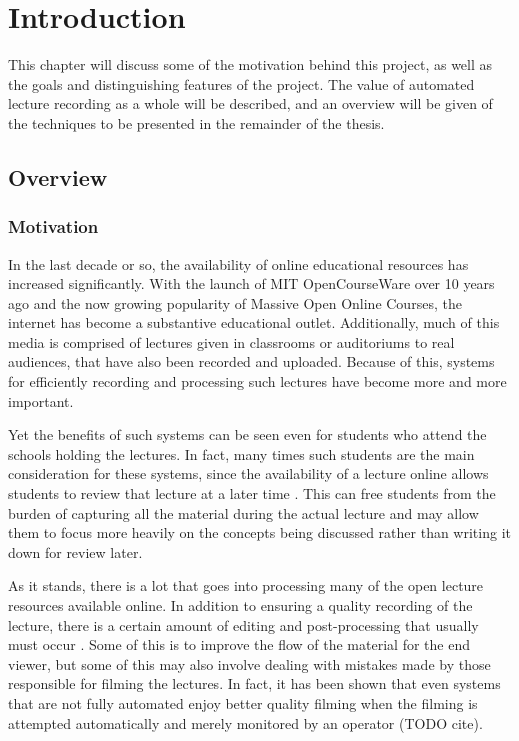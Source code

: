 \documentclass{uiucecethesis09}
\begin{document}
\chapter{Introduction}

This chapter will discuss some of the motivation behind this project, as well as
the goals and distinguishing features of the project. The value of automated
lecture recording as a whole will be described, and an overview will be given of
the techniques to be presented in the remainder of the thesis.

\section{Overview} 

  \subsection{Motivation}

    In the last decade or so, the availability of online educational resources
    has increased significantly. With the launch of MIT OpenCourseWare over 10
    years ago and the now growing popularity of Massive Open Online Courses, the
    internet has become a substantive educational outlet. Additionally, much of
    this media is comprised of lectures given in classrooms or auditoriums to
    real audiences, that have also been recorded and uploaded. Because of this,
    systems for efficiently recording and processing such lectures have become
    more and more important.

    Yet the benefits of such systems can be seen even for students who attend the
    schools holding the lectures. In fact, many times such students are the main
    consideration for these systems, since the availability of a lecture online
    allows students to review that lecture at a later time \cite{bibs}. This can
    free students from the burden of capturing all the material during the actual
    lecture and may allow them to focus more heavily on the concepts being discussed
    rather than writing it down for review later.  

    As it stands, there is a lot that goes into processing many of the open lecture
    resources available online. In addition to ensuring a quality recording of the
    lecture, there is a certain amount of editing and post-processing that usually
    must occur \cite{passivecapture}. Some of this is to improve the flow of the
    material for the end viewer, but some of this may also involve dealing with
    mistakes made by those responsible for filming the lectures. In fact, it has
    been shown that even systems that are not fully automated enjoy better quality
    filming when the filming is attempted automatically and merely monitored by an
    operator (TODO cite).
\end{document}
